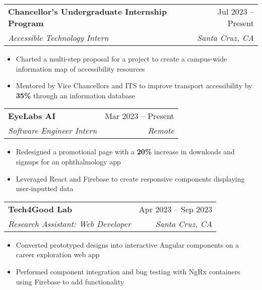 \documentclass[letterpaper,11pt]{article}
\makeatletter
\newcommand{\resumeItem}[1]{
  \item\small{
    {#1 \vspace{-2pt}}
  }
}
\newcommand{\resumeSubheading}[4]{
  \vspace{-2pt}\item
    \begin{tabular*}{0.97\textwidth}[t]{l@{\extracolsep{\fill}}r}
      \textbf{#1} & #2 \\
      \textit{\small#3} & \textit{\small #4} \\
    \end{tabular*}\vspace{-7pt}
}
\newcommand{\resumeItemListStart}{\begin{itemize}}
\newcommand{\resumeItemListEnd}{\end{itemize}\vspace{-5pt}}
\makeatother
\begin{document}
\resumeSubheading
{Chancellor's Undergraduate Internship Program}{Jul 2023 -- Present}
{Accessible Technology Intern}{Santa Cruz, CA}
\resumeItemListStart
\resumeItem{Charted a multi-step proposal for a project to create a campus-wide information map of accessibility resources}
\resumeItem{Mentored by Vice Chancellors and ITS to improve transport accessibility by \textbf{35\%} through an information database}
\resumeItemListEnd

\resumeSubheading
{EyeLabs AI}{Mar 2023 -- Present}
{Software Engineer Intern}{Remote}
\resumeItemListStart
\resumeItem{Redesigned a promotional page with a \textbf{20\%} increase in downloads and signups for an ophthalmology app}
\resumeItem{Leveraged React and Firebase to create responsive components displaying user-inputted data}
\resumeItemListEnd

\resumeSubheading
{Tech4Good Lab}{Apr 2023 -- Sep 2023}
{Research Assistant: Web Developer}{Santa Cruz, CA}
\resumeItemListStart
\resumeItem{Converted prototyped designs into interactive Angular components on a career exploration web app}
\resumeItem{Performed component integration and bug testing with NgRx containers using Firebase to add functionality}
\resumeItemListEnd



\end{document}
